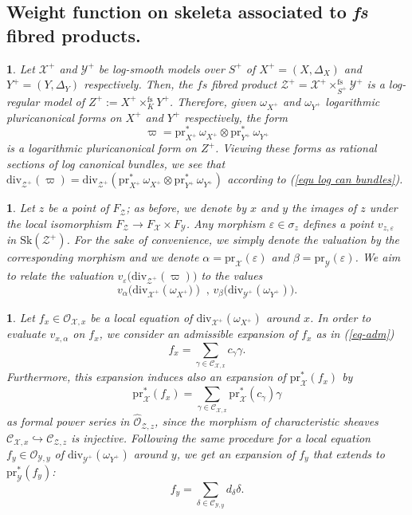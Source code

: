 \documentclass{amsart}%
\numberwithin{equation}{subsection}
\theoremstyle{plain2}
\theoremstyle{definition2}
\theoremstyle{stepstyle}
\theoremstyle{point}
\theoremstyle{subpoint}
\newtheorem{subpoint}[equation]{}%
\newcommand{\spa}[1]{\begin{subpoint}#1\end{subpoint}}           %
\newcommand{\cX}{\ensuremath{\mathscr{X}}}
\newcommand{\caC}{\ensuremath{\mathcal{C}}}
\newcommand{\caO}{\ensuremath{\mathcal{O}}}
\newcommand{\cY}{\ensuremath{\mathscr{Y}}}
\newcommand{\cZ}{\ensuremath{\mathscr{Z}}}
\renewcommand{\cZ}{\ensuremath{\mathscr{Z}}}
\renewcommand{\cY}{\ensuremath{\mathscr{Y}}}
\newcommand{\pr}{\mathrm{pr}}
\newcommand{\divisor}{\mathrm{div}}
\newcommand{\Sk}{\mathrm{Sk}}
\begin{document}
\subsection{Weight function on skeleta associated to \textit{fs} fibred products.} \label{paragraph weight function product}
\spa{Let $\cX^+$ and $\cY^+$ be log-smooth models over $S^+$ of $X^+=(X,\Delta_X)$ and $Y^+=(Y,\Delta_Y)$ respectively. Then, the $fs$ fibred product $\cZ^+=\cX^+  \times^{\text{fs}}_{S^+} \cY^+$ is a log-regular model of $Z^+:=X^+ \times^{\text{fs}}_K Y^+$. Therefore, given $\omega_{X^+}$ and $\omega_{Y^+}$ logarithmic pluricanonical forms on $X^+$ and $Y^+$ respectively, the form $$\varpi=\pr_{X^+}^* \,\omega_{X^+} \otimes \pr_{Y^+}^* \,\omega_{Y^+}$$ is a logarithmic pluricanonical form on $Z^+$. Viewing these forms as rational sections of log canonical bundles, we see that $\divisor_{\cZ^+}(\varpi)=\divisor_{\cZ^+}( \pr_{X^+}^* \,\omega_{X^+} \otimes \pr_{Y^+}^* \,\omega_{Y^+})$ according to (\ref{equ log can bundles}).}

\spa{Let $z$ be a point of $F_{\cZ}$; as before, we denote by $x$ and $y$ the images of $z$ under the local isomorphism $F_{\cZ} \rightarrow F_{\cX} \times F_{\cY}$. Any morphism $\varepsilon \in \sigma_z$ defines a point $v_{z,\varepsilon}$ in $\Sk(\cZ^+)$. For the sake of convenience, we simply denote the valuation by the corresponding morphism and we denote $\alpha= \pr_{\cX}(\varepsilon)$ and $\beta=\pr_{\cY}(\varepsilon)$. We aim to relate the valuation $v_{\varepsilon}\big(\divisor_{\cZ^+}(\varpi)\big)$ to the values $$v_{\alpha}\big(\divisor_{\cX^+}(\omega_{X^+}\big)) \text{ , } v_{\beta}\big(\divisor_{\cY^+}(\omega_{Y^+})\big).$$}

\spa{Let $f_x \in \caO_{\cX,x}$ be a local equation of $\divisor_{\cX^+}(\omega_{X^+})$ around $x$. In order to evaluate $v_{x,\alpha}$ on $f_x$, we consider an admissible expansion of $f_x$ as in (\ref{eq-adm}) $$f_x=\sum_{\gamma\in \caC_{\cX,x}}c_\gamma \gamma.$$ Furthermore, this expansion induces also an expansion of $\pr_{\cX}^*(f_x)$ by  $$\pr_{\cX}^*(f_x)=\sum_{\gamma\in \caC_{\cX,x} }\pr^*_{\cX}(c_\gamma) \gamma$$ as formal power series in $\widehat{\caO}_{\cZ,z}$, since the morphism of characteristic sheaves $\mathcal{C}_{\cX,x} \hookrightarrow \mathcal{C}_{\cZ,z}$ is injective. Following the same procedure for a local equation $f_y \in \caO_{\cY,y}$ of $\divisor_{\cY^+}(\omega_{Y^+})$ around $y$, we get an expansion of $f_y$ that extends to $\pr_{\cY}^*(f_y)$: 
$$f_y=\sum_{\delta\in \caC_{\cY,y}}d_\delta \delta.$$}
\end{document}
